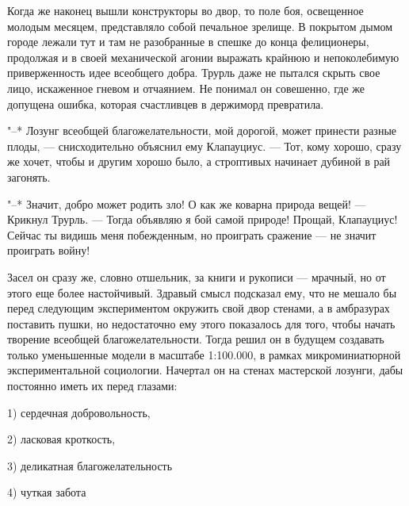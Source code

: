 Когда же наконец вышли конструкторы во двор, то поле боя,
освещенное молодым месяцем, представляло собой печальное
зрелище. В покрытом дымом городе лежали тут и там не
разобранные в спешке до конца фелиционеры, продолжая и в
своей механической агонии выражать крайнюю и непоколебимую
приверженность идее всеобщего добра. Трурль даже не пытался
скрыть свое лицо, искаженное гневом и отчаянием. Не понимал
он совешенно, где же допущена ошибка, которая счастливцев в
держиморд превратила.

"--* Лозунг всеобщей благожелательности, мой дорогой, может
принести разные плоды, --- снисходительно объяснил ему
Клапауциус. --- Тот, кому хорошо, сразу же хочет, чтобы и
другим хорошо было, а строптивых начинает дубиной в рай
загонять.

"--* Значит, добро может родить зло! О как же коварна
природа вещей! --- Крикнул Трурль. --- Тогда объявляю я бой
самой природе! Прощай, Клапауциус! Сейчас ты видишь меня
побежденным, но проиграть сражение --- не значит проиграть
войну!

Засел он сразу же, словно отшельник, за книги и рукописи --- мрачный,
но от этого еще более настойчивый. Здравый смысл
подсказал ему, что не мешало бы перед следующим
экспериментом окружить свой двор стенами, а в амбразурах
поставить пушки, но недостаточно ему этого показалось для
того, чтобы начать творение всеобщей благожелательности.
Тогда решил он в будущем создавать только уменьшенные модели
в масштабе 1:100.000, в рамках микроминиатюрной
экспериментальной социологии. Начертал он на стенах
мастерской лозунги, дабы постоянно иметь их перед глазами:

1) сердечная добровольность,

2) ласковая кроткость,

3) деликатная благожелательность

4) чуткая забота

